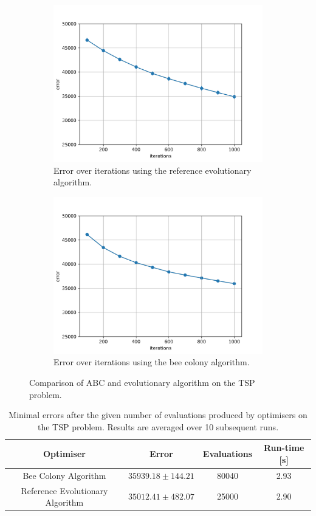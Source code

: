 \begin{figure}[h]
	\centering
	\begin{subfigure}{.5\textwidth}
		\centering
		\captionsetup{width=0.75\linewidth}
		\includegraphics[width=0.75\linewidth]{assets/reference_tsp.png}
		\caption{Error over iterations using the reference evolutionary algorithm.}
		\label{fig:reference_tsp}
	\end{subfigure}%
	\begin{subfigure}{.5\textwidth}
		\centering
    \captionsetup{width=0.75\linewidth}
		\includegraphics[width=0.75\linewidth]{assets/beecolony_tsp.png}
		\caption{Error over iterations using the bee colony algorithm.}
		\label{fig:becolony_tsp}
	\end{subfigure}
	\caption{Comparison of ABC and evolutionary algorithm on the TSP problem.}
	\label{fig:bee_vs_ea}
\end{figure}

\begin{table}[H]
	\centering
	\begin{tabular}{|c c c c|}
		\hline
		\textbf{Optimiser} & \textbf{Error} & \textbf{Evaluations} & \textbf{Run-time [s]} \\
		\hline
		Bee Colony Algorithm & $35939.18 \pm 144.21$ & 80040 & 2.93 \\
		Reference Evolutionary Algorithm & $35012.41 \pm 482.07$ & 25000 & 2.90 \\
		\hline
	\end{tabular}
	\caption{Minimal errors after the given number of evaluations produced by optimisers on the TSP problem. Results are averaged over 10 subsequent runs.}
	\label{tab:bee_vs_ea}
\end{table}
